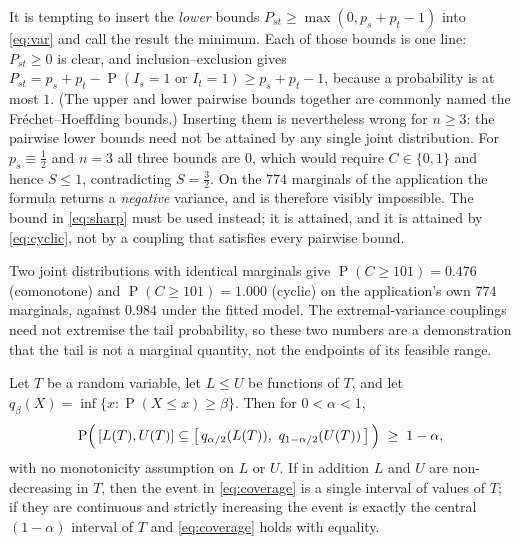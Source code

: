 \begin{remark}
\label{rem:pairwise}
It is tempting to insert the \emph{lower} bounds
$P_{st} \ge \max(0,p_s+p_t-1)$ into \eqref{eq:var} and call the result the
minimum.  Each of those bounds is one line: $P_{st} \ge 0$ is clear, and
inclusion--exclusion gives
$P_{st} = p_s+p_t-\operatorname{P}(I_s=1 \text{ or } I_t=1) \ge p_s+p_t-1$,
because a probability is at most $1$.  (The upper and lower pairwise bounds
together are commonly named the Fr\'echet--Hoeffding bounds.)  Inserting them
is nevertheless wrong for $n \ge 3$: the pairwise lower bounds need not be
attained by any single joint distribution.  For $p_s \equiv \tfrac12$ and $n=3$ all three
bounds are $0$, which would require $C \in \{0,1\}$ and hence $S \le 1$,
contradicting $S=\tfrac32$.  On the $774$ marginals of the application the
formula returns a \emph{negative} variance, and is therefore visibly
impossible.  The bound in \eqref{eq:sharp} must be used instead; it is
attained, and it is attained by \eqref{eq:cyclic}, not by a coupling that
satisfies every pairwise bound.
\end{remark}

\begin{remark}
\label{rem:tail}
Two joint distributions with identical marginals give
$\operatorname{P}(C \ge 101) = 0.476$ (comonotone) and
$\operatorname{P}(C \ge 101) = 1.000$ (cyclic) on the application's own
$774$ marginals, against $0.984$ under the fitted model.  The extremal-variance
couplings need not extremise the tail probability, so these two numbers are a
demonstration that the tail is not a marginal quantity, not the endpoints of
its feasible range.
\end{remark}

\begin{proposition}
\label{prop:coverage}
Let $T$ be a random variable, let $L \le U$ be functions of $T$, and let
$q_\beta(X) = \inf\{x : \operatorname{P}(X \le x) \ge \beta\}$.  Then for
$0<\alpha<1$,
\begin{equation}
  \operatorname{P}\Bigl(\,[L(T),U(T)] \subseteq
    \bigl[\,q_{\alpha/2}(L(T)),\ q_{1-\alpha/2}(U(T))\,\bigr]\,\Bigr)
  \;\ge\; 1-\alpha ,
  \label{eq:coverage}
\end{equation}
with no monotonicity assumption on $L$ or $U$.  If in addition $L$ and $U$ are
non-decreasing in $T$, then the event in \eqref{eq:coverage} is a single
interval of values of $T$; if they are continuous and strictly increasing the
event is exactly the central $(1-\alpha)$ interval of $T$ and
\eqref{eq:coverage} holds with equality.
\end{proposition}

